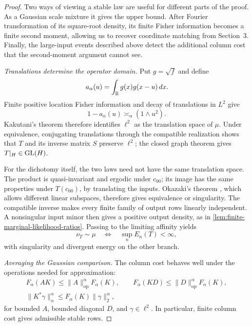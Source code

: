 \begin{proof}
Two ways of viewing a stable law are useful for different parts of the
proof. As a Gaussian scale mixture it gives the upper bound. After Fourier
transformation of its square-root density, its finite Fisher information
becomes a finite second moment, allowing us to recover coordinate matching
from Section~3. Finally, the large-input events described above detect the
additional column cost that the second-moment argument cannot see.

\emph{Translations determine the operator domain.}
Put \(g=\sqrt{f}\) and define
\[
 a_\alpha(u)=\int_\mathbb R g(x)g(x-u)\,dx.
\]
Finite positive location Fisher information and decay of translations in
\(L^2\) give
\begin{equation}
 1-a_\alpha(u)\asymp_\alpha(1\wedge u^2).
 \label{eq:stable-translation-affinity}
\end{equation}
Kakutani's theorem therefore identifies \(\ell^2\) as the translation space
of \(\mu\).  Under equivalence, conjugating translations through the
compatible realization shows that \(T\) and its inverse matrix \(S\) preserve
\(\ell^2\); the closed graph theorem gives \(T|_H\in\operatorname{GL}(H)\).

For the dichotomy itself, the two laws need not have the same translation
space. The product is quasi-invariant and ergodic under \(c_{00}\);
its image has the same properties under \(T(c_{00})\), by translating the
inputs. Okazaki's theorem \cite{okazaki1985dichotomy}, which allows different
linear subspaces, therefore gives equivalence or singularity. The compatible
inverse makes every finite family of output rows linearly independent.
A nonsingular input minor then gives a positive output density, as in
\cref{lem:finite-marginal-likelihood-ratios}. Passing to the limiting
affinity yields
\begin{equation}
 \nu_{T}\sim\mu
 \quad\Longleftrightarrow\quad
 \sup_nE_n(T)<\infty,
 \label{eq:stable-energy-dichotomy}
\end{equation}
with singularity and divergent energy on the other branch.

\emph{Averaging the Gaussian comparison.}
The column cost behaves well under the operations needed for approximation:
\begin{equation}
 \begin{gathered}
 F_\alpha(AK)\le\|A\|_{\mathrm{op}}^\alpha F_\alpha(K),
 \qquad
 F_\alpha(KD)\le\|D\|_{\mathrm{op}}^\alpha F_\alpha(K),\\
    \|K^*\gamma\|_\alpha^\alpha
    \le F_\alpha(K)\|\gamma\|_2^\alpha,
 \end{gathered}
 \label{eq:stable-column-class-bounds}
\end{equation}
for bounded \(A\), bounded diagonal \(D\), and \(\gamma\in\ell^2\).  In
particular, finite column cost gives admissible stable rows.


\end{proof}
